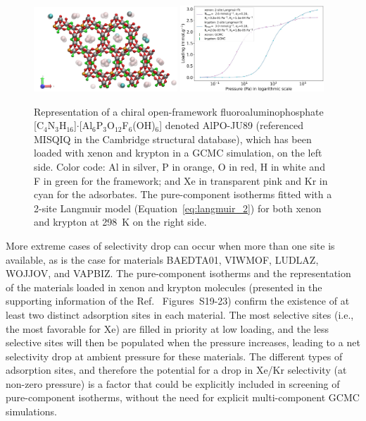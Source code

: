 \documentclass[main.tex]{subfiles}
\begin{document}
\begin{figure}[t]
  \centering
    \includegraphics[width=0.48\textwidth]{figures/2-thermo/MISQIQ_clean.jpg}\hfill
    \includegraphics[width=0.48\textwidth]{figures/2-thermo/MISQIQ_clean_isotherm_xenon_krypton_298K.jpg}
    \caption{Representation of a chiral open-framework fluoroaluminophosphate [C$_4$N$_3$H$_{16}$]$\cdot$[Al$_6$P$_3$O$_{12}$F$_6$(OH)$_6$] denoted AlPO-JU89 (referenced MISQIQ in the Cambridge structural database), which has been loaded with xenon and krypton in a GCMC simulation, on the left side.\autocite{MISQIQ} Color code: Al in silver, P in orange, O in red, H in white and F in green for the framework; and Xe in transparent pink and Kr in cyan for the adsorbates. The pure-component isotherms fitted with a 2-site Langmuir model (Equation~\ref{eq:langmuir_2}) for both xenon and krypton at \SI{298}{\kelvin} on the right side.}\label{fgr:MISQIQ}
  \end{figure}

More extreme cases of selectivity drop can occur when more than one site is available, as is the case for materials BAEDTA01, VIWMOF, LUDLAZ, WOJJOV, and VAPBIZ. The pure-component isotherms and the representation of the materials loaded in xenon and krypton molecules (presented in the supporting information of the Ref.~\cite{Ren_2021} Figures~S19-23) confirm the existence of at least two distinct adsorption sites in each material. The most selective sites (i.e., the most favorable for Xe) are filled in priority at low loading, and the less selective sites will then be populated when the pressure increases, leading to a net selectivity drop at ambient pressure for these materials. The different types of adsorption sites, and therefore the potential for a drop in Xe/Kr selectivity (at non-zero pressure) is a factor that could be explicitly included in screening of pure-component isotherms, without the need for explicit multi-component GCMC simulations.
\end{document}
